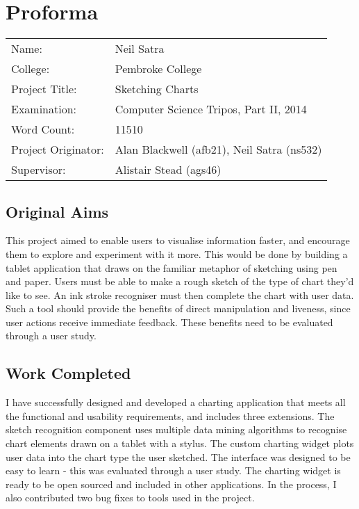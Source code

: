 \chapter*{Proforma}

\begin{tabular}{ll}
Name:               & Neil Satra					\\
College:            & Pembroke College				\\
Project Title:      & Sketching Charts				\\
Examination:        & Computer Science Tripos, Part II, 2014        \\
Word Count:         & 11510							\\
Project Originator: & Alan Blackwell (afb21), Neil Satra (ns532)        \\
Supervisor:         & Alistair Stead (ags46)				\\ 
\end{tabular}

\section*{Original Aims}
This project aimed to enable users to visualise information faster, and encourage them to explore and experiment with it more. This would be done by building a tablet application that draws on the familiar metaphor of sketching using pen and paper. Users must be able to make a rough sketch of the type of chart they'd like to see. An ink stroke recogniser must then complete the chart with user data. Such a tool should provide the benefits of direct manipulation and liveness, since user actions receive immediate feedback. These benefits need to be evaluated through a user study.

\section*{Work Completed}
I have successfully designed and developed a charting application that meets all the functional and usability requirements, and includes three extensions. The sketch recognition component uses multiple data mining algorithms to recognise chart elements drawn on a tablet with a stylus. The custom charting widget plots user data into the chart type the user sketched. The interface was designed to be easy to learn - this was evaluated through a user study. The charting widget is ready to be open sourced and included in other applications. In the process, I also contributed two bug fixes to tools used in the project.


